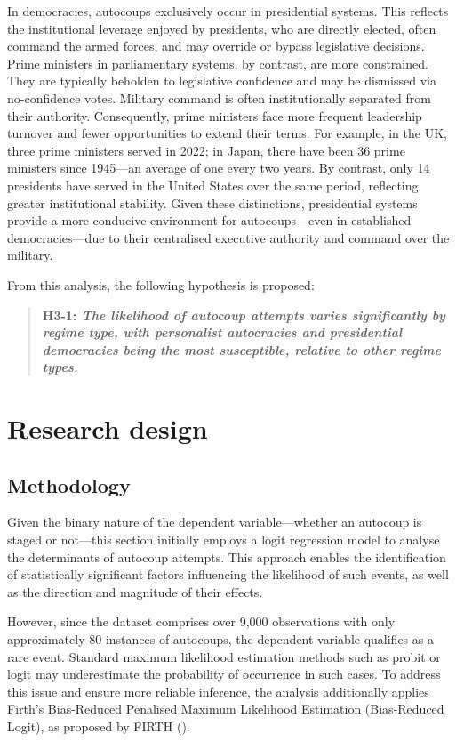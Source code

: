 \documentclass[
  12pt,
]{report}
\begin{document}
In democracies, autocoups exclusively occur in presidential systems.
This reflects the institutional leverage enjoyed by presidents, who are
directly elected, often command the armed forces, and may override or
bypass legislative decisions. Prime ministers in parliamentary systems,
by contrast, are more constrained. They are typically beholden to
legislative confidence and may be dismissed via no-confidence votes.
Military command is often institutionally separated from their
authority. Consequently, prime ministers face more frequent leadership
turnover and fewer opportunities to extend their terms. For example, in
the UK, three prime ministers served in 2022; in Japan, there have been
36 prime ministers since 1945---an average of one every two years. By
contrast, only 14 presidents have served in the United States over the
same period, reflecting greater institutional stability. Given these
distinctions, presidential systems provide a more conducive environment
for autocoups---even in established democracies---due to their
centralised executive authority and command over the military.

From this analysis, the following hypothesis is proposed:

\begin{quote}
\textbf{H3-1: \emph{The likelihood of autocoup attempts varies
significantly by regime type, with personalist autocracies and
presidential democracies being the most susceptible, relative to other
regime types.}}
\end{quote}

\section{Research design}\label{research-design}

\subsection*{Methodology}\label{methodology}

Given the binary nature of the dependent variable---whether an autocoup
is staged or not---this section initially employs a logit regression
model to analyse the determinants of autocoup attempts. This approach
enables the identification of statistically significant factors
influencing the likelihood of such events, as well as the direction and
magnitude of their effects.

However, since the dataset comprises over 9,000 observations with only
approximately 80 instances of autocoups, the dependent variable
qualifies as a rare event. Standard maximum likelihood estimation
methods such as probit or logit may underestimate the probability of
occurrence in such cases. To address this issue and ensure more reliable
inference, the analysis additionally applies Firth's Bias-Reduced
Penalised Maximum Likelihood Estimation (Bias-Reduced Logit), as
proposed by FIRTH ().
\end{document}
